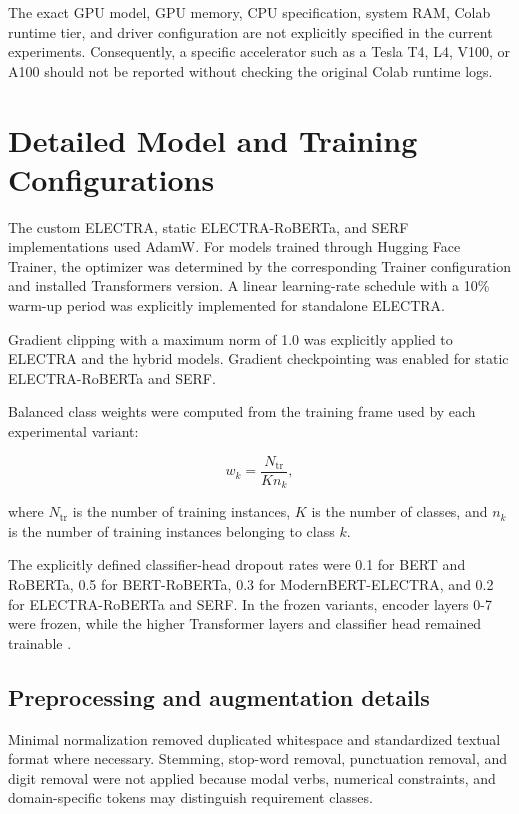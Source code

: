 \documentclass[runningheads]{llncs}
\begin{document}
The exact GPU model, GPU memory, CPU specification, system RAM, Colab runtime tier, and driver configuration are not explicitly specified in the current experiments. Consequently, a specific accelerator such as a Tesla T4, L4, V100, or A100 should not be reported without checking the original Colab runtime logs.

\section{Detailed Model and Training Configurations}\label{app:training-configurations}

The custom ELECTRA, static ELECTRA-RoBERTa, and SERF implementations used AdamW. For models trained through Hugging Face Trainer, the optimizer was determined by the corresponding Trainer configuration and installed Transformers version. A linear learning-rate schedule with a 10\% warm-up period was explicitly implemented for standalone ELECTRA.

Gradient clipping with a maximum norm of 1.0 was explicitly applied to ELECTRA and the hybrid models. Gradient checkpointing was enabled for static ELECTRA-RoBERTa and SERF.

Balanced class weights were computed from the training frame used by each experimental variant:

\[ w_k=\frac{N_{\mathrm{tr}}}{K n_k}, \]

where \(N_{\mathrm{tr}}\) is the number of training instances, \(K\) is the number of classes, and \(n_k\) is the number of training instances belonging to class \(k\).

The explicitly defined classifier-head dropout rates were 0.1 for BERT and RoBERTa, 0.5 for BERT-RoBERTa, 0.3 for ModernBERT-ELECTRA, and 0.2 for ELECTRA-RoBERTa and SERF. In the frozen variants, encoder layers 0-7 were frozen, while the higher Transformer layers and classifier head remained trainable \cite{said_functional_nonfunctional}.

\subsection*{Preprocessing and augmentation details}

Minimal normalization removed duplicated whitespace and standardized textual format where necessary. Stemming, stop-word removal, punctuation removal, and digit removal were not applied because modal verbs, numerical constraints, and domain-specific tokens may distinguish requirement classes.
\end{document}
